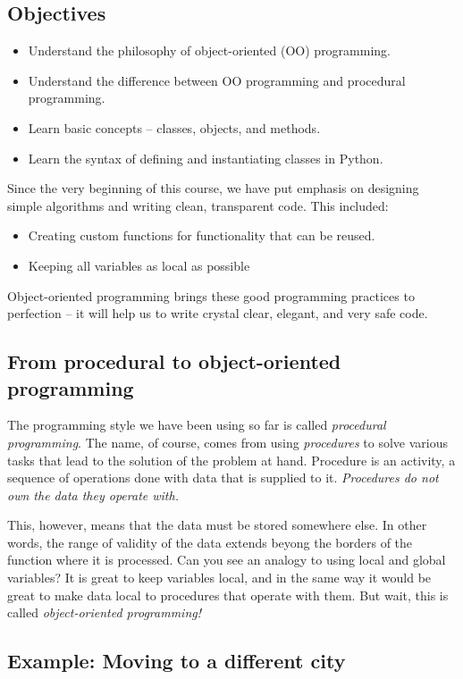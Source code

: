 \subsection{Objectives}

\begin{itemize}
\item Understand the philosophy of object-oriented (OO) programming.
\item Understand the difference between OO programming and procedural programming.
\item Learn basic concepts -- classes, objects, and methods.
\item Learn the syntax of defining and instantiating classes in Python.
\end{itemize}
Since the very beginning of this course, 
we have put emphasis on designing simple algorithms
and writing clean, transparent code. This included:
\begin{itemize}
\item Creating custom functions for functionality that can be reused.
\item Keeping all variables as local as possible
\end{itemize}
Object-oriented programming brings these good programming practices to
perfection -- it will help us to write crystal clear, elegant, and very safe code.

\subsection{From procedural to object-oriented programming}

The programming style we have been using so far is called {\em procedural programming}.
The name, of course, comes from using {\em procedures} to solve various tasks that 
lead to the solution of the problem at hand. Procedure is an activity, a sequence of operations 
done with data that is supplied to it. {\em Procedures do not own the data they 
operate with.} 

This, however, means that the data must be stored somewhere else. In other
words, the range of validity of the data extends beyong the borders of the 
function where it is processed. 
Can you see an analogy to using local and global variables? It is great
to keep variables local, and in the same way it would be great to make
data local to procedures that operate with them. But wait, this is called {\em 
object-oriented programming!}

\subsection{Example: Moving to a different city}

